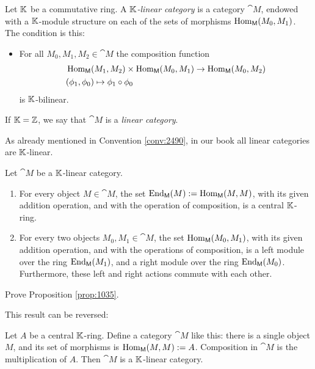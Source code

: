 \begin{dfn} \label{dfn:1083}
Let $\mathbb{K}$ be a commutative ring. 
A  {\em $\mathbb{K}$-linear category}%
%
is a category $\cat{M}$, endowed with 
a $\mathbb{K}$-module structure on each of the sets of morphisms  
$\operatorname{Hom}_{\operatorname{\mathsf{M}}}(M_0, M_1)$. The condition is this:
\begin{itemize}
\item For all $M_0, M_1, M_2 \in \cat{M}$ the composition function 
\[ \begin{aligned}
& \operatorname{Hom}_{\operatorname{\mathsf{M}}}(M_1, M_2) \times \operatorname{Hom}_{\operatorname{\mathsf{M}}}(M_0, M_1)
\to \operatorname{Hom}_{\operatorname{\mathsf{M}}}(M_0, M_2) \\
& (\phi_1, \phi_0) \mapsto \phi_1 \circ \phi_0 
\end{aligned} \]
is $\mathbb{K}$-bilinear.
\end{itemize}
If $\mathbb{K} = \mathbb{Z}$, we say that $\cat{M}$ is a {\em linear category}.
\end{dfn}

As already mentioned in Convention \ref{conv:2490}, in our book all linear 
categories are $\mathbb{K}$-linear. 

\begin{prop} \label{prop:1035}
Let $\cat{M}$ be a $\mathbb{K}$-linear category.
\begin{enumerate}
\item For every object $M \in \cat{M}$, the set 
$\operatorname{End}_{\operatorname{\mathsf{M}}}(M) := \operatorname{Hom}_{\operatorname{\mathsf{M}}}(M, M)$,
with its given addition operation, and with the operation of composition,
is a central $\mathbb{K}$-ring. 

\item For every two objects $M_0, M_1 \in \cat{M}$, the set 
$\operatorname{Hom}_{\operatorname{\mathsf{M}}}(M_0, M_1)$,
with its given addition operation, and with the operations of composition,
is a left module over the ring $\operatorname{End}_{\operatorname{\mathsf{M}}}(M_1)$, and 
a right module over the ring $\operatorname{End}_{\operatorname{\mathsf{M}}}(M_0)$.
Furthermore, these left and right actions commute with each other. 
\end{enumerate}
\end{prop}

\begin{exer} \label{exer:3255}
Prove Proposition \ref{prop:1035}.
\end{exer}

This result can be reversed:

\begin{exa} \label{exa:104}
Let $A$ be a central $\mathbb{K}$-ring.  
Define a category $\cat{M}$ like this: there is a single object $M$, and its
set of morphisms is
$\operatorname{Hom}_{\operatorname{\mathsf{M}}}(M, M) := A$.
Composition in $\cat{M}$ is the multiplication of $A$. Then $\cat{M}$ is a
$\mathbb{K}$-linear category.
\end{exa}

